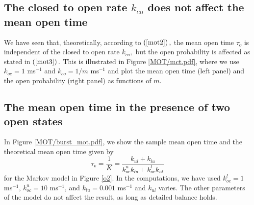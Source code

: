 

\subsection{The closed to open rate $k_{co}$ does not affect the mean open
time}

We have seen that, theoretically, according to $\left(  \ref{mot2}\right)  ,$
the mean open time $\tau_{o}$ is independent of the closed to open rate
$k_{co},$ but the open probability is affected as stated in $\left(
\ref{mot3}\right)  .$ This is illustrated in Figure \ref{MOT/mct.pdf}, where we use
$k_{oc}=1$ ms$^{-1}$ and $k_{co}=1/m$ ms$^{-1}$ 
and plot the mean open time (left panel) and the open
probability (right panel) as functions of $m.$



\subsection{The mean open time in the presence of two open states}
In Figure \ref{MOT/burst_mot.pdf}, we show the sample mean open time and the theoretical mean open time given by 
\begin{equation}
\tau_{o}=\frac{1}{K}=\frac{k_{ul}+k_{lu}}{k_{oc}^{u}k_{lu}+k_{oc}^{l}k_{ul}} 
\end{equation}
for the Markov model in Figure \ref{o2}. In the computations, we have used $k^l_{oc} = 1$ ms$^{-1}$, $k^u_{oc} = 10$ ms$^{-1}$, and $k_{lu}  = 0.001$ ms$^{-1}$ and $k_{ul}$ varies. The other parameters of the model do not affect the result, as long as detailed balance holds.


